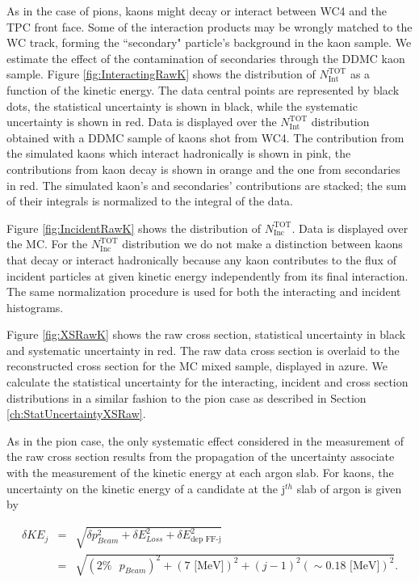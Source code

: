 As in the case of pions, kaons might decay or interact between WC4 and the TPC front face. Some of the interaction products may be wrongly matched to the WC track, forming the ``secondary" particle's background in the kaon sample. We estimate the effect of the contamination of secondaries through  the DDMC kaon sample.
Figure \ref{fig:InteractingRawK} shows the distribution of  $N^{\text{TOT}}_{\text{Int}}$  as a function of the kinetic energy. The data central points are represented by black dots, the statistical uncertainty is shown in black, while the systematic uncertainty is shown in red. Data is displayed over the $N^{\text{TOT}}_{\text{Int}}$  distribution obtained with a DDMC  sample of kaons shot from WC4.  
The contribution from the simulated kaons which interact hadronically is shown in pink, the contributions from kaon decay is shown in orange and the one from secondaries in red. 
The simulated kaon's and secondaries' contributions are stacked; the sum of their integrals is normalized to the integral of the data.
 
Figure \ref{fig:IncidentRawK} shows the distribution of  $N^{\text{TOT}}_{\text{Inc}}$. Data is displayed over the MC. For the  $N^{\text{TOT}}_{\text{Inc}}$ distribution we do not make a distinction between kaons that decay or interact hadronically because any kaon contributes to the flux of incident particles at given kinetic energy independently from its final interaction.
The same normalization procedure is used for both the interacting and incident histograms. 


Figure \ref{fig:XSRawK} shows the raw cross section, statistical uncertainty in black and systematic uncertainty in red. The raw data cross section is overlaid to the reconstructed cross section for the MC mixed sample, displayed in azure.  We calculate the statistical uncertainty for the interacting, incident and cross section distributions in a similar fashion to the pion case as described in Section \ref{ch:StatUncertaintyXSRaw}. 

As in the pion case, the only systematic effect considered in the measurement of the raw cross section results from the propagation of the uncertainty associate with the measurement of the kinetic energy at each argon slab. For kaons, the uncertainty on the kinetic energy of a candidate at the j$^{th}$ slab of argon  is given by

\begin{eqnarray}
\delta KE_{j} &=& \sqrt{\delta p_{Beam}^2 + \delta E_{Loss}^2 +  \delta  E_{\text{dep FF-j}}^2}\\
&=& \sqrt{(2\% \text{ }p_{Beam})^2 +  (7 \text{ [MeV]})^2 +  (j-1)^2 (\sim0.18\text{ [MeV]})^2}.
\end{eqnarray}

